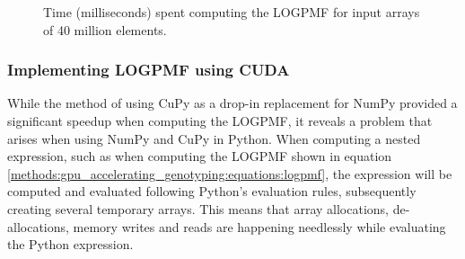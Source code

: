 \begin{figure}[H]
\hspace*{6.8em}
\caption{
  Time (milliseconds) spent computing the LOGPMF for input arrays of 40 million elements.
}
\label{methods:gpu_accelerating_genotyping:figures:logpmf_benchmark}
\end{figure}

\subsubsection{Implementing LOGPMF using CUDA}
While the method of using CuPy as a drop-in replacement for NumPy provided a significant speedup when computing the LOGPMF, it reveals a problem that arises when using NumPy and CuPy in Python.
When computing a nested expression, such as when computing the LOGPMF shown in equation \ref{methods:gpu_accelerating_genotyping:equations:logpmf}, the expression will be computed and evaluated following Python's evaluation rules, subsequently creating several temporary arrays.
This means that array allocations, de-allocations, memory writes and reads are happening needlessly while evaluating the Python expression.

